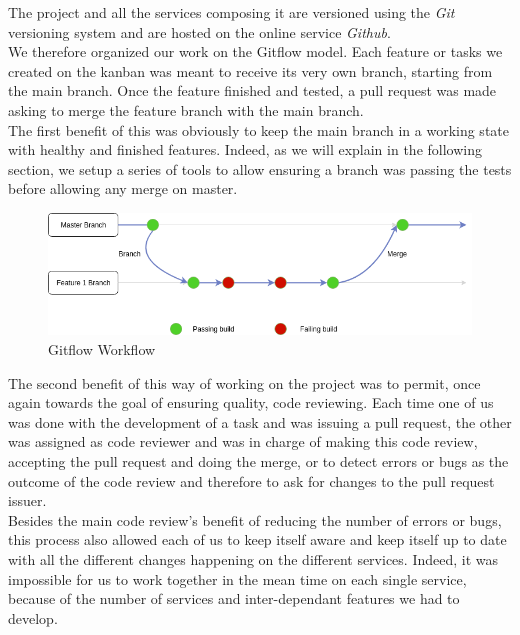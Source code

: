 \documentclass{eplmastersthesis}
\begin{document}
          The project and all the services composing it are versioned using the
          \textit{Git} versioning system and are hosted on the online service
          \textit{Github}.\\
          We therefore organized our work on the Gitflow model. Each feature or
          tasks we created on the kanban was meant to receive its very own
          branch, starting from the main branch.
          Once the feature finished and tested, a pull request was made asking
          to merge the feature branch with the main branch.\\
          The first benefit of this was obviously to keep the main branch in
          a working state with healthy and finished features. Indeed, as
          we will explain in the following section, we setup a series of tools
          to allow ensuring a branch was passing the tests before allowing any
          merge on master.\\

          \begin{figure}[H]
            \centering
            \includegraphics[scale=0.6]{figures/gitflow.png}
            \caption{\label{prev_arch} Gitflow Workflow}
          \end{figure}

          The second benefit of this way of working on the project was to
          permit, once again towards the goal of ensuring quality, code
          reviewing. Each time one of us was done with the development of a
          task and was issuing a pull request, the other was assigned as code
          reviewer and was in charge of making this code review, accepting the
          pull request and doing the merge, or to detect errors or bugs as the
          outcome of the code review and therefore to ask for changes to the
          pull request issuer.\\
          Besides the main code review's benefit of reducing the number of
          errors or bugs, this process also allowed each of us to keep itself
          aware and keep itself up to date with all the different changes
          happening on the different services. Indeed, it was impossible for
          us to work together in the mean time on each single service, because
          of the number of services and inter-dependant features we had to
          develop.
\end{document}
